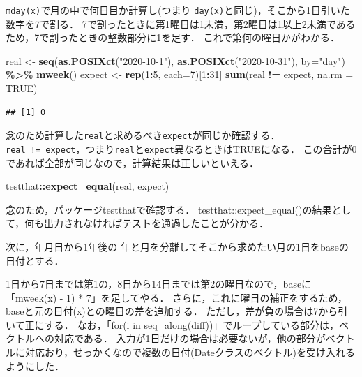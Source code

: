 \documentclass[
]{article}
\newenvironment{Shaded}{\begin{snugshade}}{\end{snugshade}}
\newcommand{\AttributeTok}[1]{\textcolor[rgb]{0.13,0.29,0.53}{#1}}
\newcommand{\ConstantTok}[1]{\textcolor[rgb]{0.56,0.35,0.01}{#1}}
\newcommand{\DecValTok}[1]{\textcolor[rgb]{0.00,0.00,0.81}{#1}}
\newcommand{\FunctionTok}[1]{\textcolor[rgb]{0.13,0.29,0.53}{\textbf{#1}}}
\newcommand{\NormalTok}[1]{#1}
\newcommand{\OtherTok}[1]{\textcolor[rgb]{0.56,0.35,0.01}{#1}}
\newcommand{\SpecialCharTok}[1]{\textcolor[rgb]{0.81,0.36,0.00}{\textbf{#1}}}
\newcommand{\StringTok}[1]{\textcolor[rgb]{0.31,0.60,0.02}{#1}}
\begin{document}
\texttt{mday(x)}で月の中で何日目か計算し(つまり \texttt{day(x)}と同じ)，そこから1日引いた数字を7で割る．
7で割ったときに第1曜日は1未満，第2曜日は1以上2未満であるため，7で割ったときの整数部分に1を足す．
これで第何の曜日かがわかる．

\begin{Shaded}
\begin{Highlighting}[]
\NormalTok{real    }\OtherTok{\textless{}{-}} \FunctionTok{seq}\NormalTok{(}\FunctionTok{as.POSIXct}\NormalTok{(}\StringTok{"2020{-}10{-}1"}\NormalTok{), }\FunctionTok{as.POSIXct}\NormalTok{(}\StringTok{"2020{-}10{-}31"}\NormalTok{), }\AttributeTok{by=}\StringTok{"day"}\NormalTok{) }\SpecialCharTok{\%\textgreater{}\%} \FunctionTok{mweek}\NormalTok{()}
\NormalTok{expect }\OtherTok{\textless{}{-}} \FunctionTok{rep}\NormalTok{(}\DecValTok{1}\SpecialCharTok{:}\DecValTok{5}\NormalTok{, }\AttributeTok{each=}\DecValTok{7}\NormalTok{)[}\DecValTok{1}\SpecialCharTok{:}\DecValTok{31}\NormalTok{]}
\FunctionTok{sum}\NormalTok{(real }\SpecialCharTok{!=}\NormalTok{ expect, }\AttributeTok{na.rm =} \ConstantTok{TRUE}\NormalTok{)}
\end{Highlighting}
\end{Shaded}

\begin{verbatim}
## [1] 0
\end{verbatim}

念のため計算した\texttt{real}と求めるべき\texttt{expect}が同じか確認する．
\texttt{real\ !=\ expect}，つまり\texttt{real}と\texttt{expect}異なるときはTRUEになる．
この合計が0であれば全部が同じなので，計算結果は正しいといえる．

\begin{Shaded}
\begin{Highlighting}[]
\NormalTok{testthat}\SpecialCharTok{::}\FunctionTok{expect\_equal}\NormalTok{(real, expect)}
\end{Highlighting}
\end{Shaded}

念のため，パッケージtestthatで確認する．
testthat::expect\_equal()の結果として，何も出力されなければテストを通過したことが分かる．

次に，年月日から1年後の
年と月を分離してそこから求めたい月の1日をbaseの日付とする．

1日から7日までは第1の，8日から14日までは第2の曜日なので，baseに「mweek(x) - 1) * 7」を足してやる．
さらに，これに曜日の補正をするため，baseと元の日付(x)との曜日の差を追加する．
ただし，差が負の場合は7から引いて正にする．
なお，「for(i in seq\_along(diff))」でループしている部分は，ベクトルへの対応である．
入力が1日だけの場合は必要ないが，他の部分がベクトルに対応おり，せっかくなので複数の日付(Dateクラスのベクトル)を受け入れるようにした．
\end{document}

